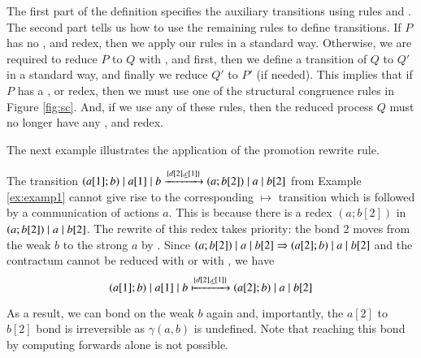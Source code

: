 {{The first part of the definition specifies the auxiliary transitions using rules  and 
. The second
part tells us how to use the remaining rules to define transitions. If $P$ has no , 
 and  redex, then we apply our rules in a standard way. Otherwise, we are 
required to reduce $P$ to $Q$ with ,  and  first, 
then we define a transition of $Q$ to $Q'$
in a standard way, and finally we reduce $Q'$ to $P'$ (if needed). This implies that 
if $P$ has a ,  or  redex, then we must use one 
of the structural congruence rules in Figure \ref{fig:sc}. 
And, if we use any of these rules, then the reduced process $Q$ must no longer have any 
,  and  redex. 
}
%

The next example illustrates the application of the promotion rewrite rule.
\begin{example}\label{example4}
{\rm The transition 
$(a[1];b) \; \vert \; a[1] \; \vert \;  b \xrightarrow{\{d[2], \underline{c}[1]\}} (a;b[2])\; \vert \; a \; \vert \; b[2]$ 
from Example \ref{ex:examp1} cannot give rise to the corresponding $\mapsto$ transition which is followed by a communication of actions $a$. This is because there
is a  redex $(a;b[2])$ in $(a;b[2])\; \vert \; a \; \vert \; b[2]$. The rewrite of this redex takes 
priority: the bond 2 moves from the weak $b$ to the strong $a$ by . Since 
$(a;b[2])\; \vert \; a \; \vert \; b[2] \Rightarrow (a[2];b)\; \vert \; a \; \vert \; b[2] $ and the contractum cannot be reduced with  or
with , we have 
$$(a[1];b) \; \vert \; a[1] \; \vert \;  b \xmapsto{\{d[2], \underline{c}[1]\}} (a[2];b)\; \vert \; a \; \vert \; b[2]$$

As a result, we can bond on the weak $b$ again and, importantly, the $a[2]$ to $b[2]$ bond is irreversible
as $\gamma(a,b)$ is undefined. Note that reaching
this bond by computing forwards alone is not possible.}
\end{example}

}
